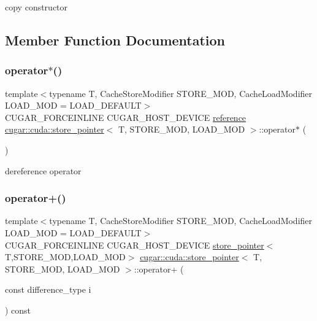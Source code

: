 copy constructor 

\subsection{Member Function Documentation}
\mbox{\label{structcugar_1_1cuda_1_1store__pointer_ac3707b27702fa0ef02349be879a4cc0e}} 
\subsubsection{\texorpdfstring{operator$\ast$()}{operator*()}}
{\footnotesize\ttfamily template$<$typename T, Cache\+Store\+Modifier S\+T\+O\+R\+E\+\_\+\+M\+OD, Cache\+Load\+Modifier L\+O\+A\+D\+\_\+\+M\+OD = L\+O\+A\+D\+\_\+\+D\+E\+F\+A\+U\+LT$>$ \\
C\+U\+G\+A\+R\+\_\+\+F\+O\+R\+C\+E\+I\+N\+L\+I\+NE C\+U\+G\+A\+R\+\_\+\+H\+O\+S\+T\+\_\+\+D\+E\+V\+I\+CE \hyperlink{structcugar_1_1cuda_1_1store__reference}{reference} \hyperlink{structcugar_1_1cuda_1_1store__pointer}{cugar\+::cuda\+::store\+\_\+pointer}$<$ T, S\+T\+O\+R\+E\+\_\+\+M\+OD, L\+O\+A\+D\+\_\+\+M\+OD $>$\+::operator$\ast$ (\begin{DoxyParamCaption}{ }\end{DoxyParamCaption})\hspace{0.3cm}{\ttfamily [inline]}}

dereference operator \mbox{\label{structcugar_1_1cuda_1_1store__pointer_a8ba7f0f228024195d9de88d3341c6aa6}} 
\subsubsection{\texorpdfstring{operator+()}{operator+()}}
{\footnotesize\ttfamily template$<$typename T, Cache\+Store\+Modifier S\+T\+O\+R\+E\+\_\+\+M\+OD, Cache\+Load\+Modifier L\+O\+A\+D\+\_\+\+M\+OD = L\+O\+A\+D\+\_\+\+D\+E\+F\+A\+U\+LT$>$ \\
C\+U\+G\+A\+R\+\_\+\+F\+O\+R\+C\+E\+I\+N\+L\+I\+NE C\+U\+G\+A\+R\+\_\+\+H\+O\+S\+T\+\_\+\+D\+E\+V\+I\+CE \hyperlink{structcugar_1_1cuda_1_1store__pointer}{store\+\_\+pointer}$<$T,S\+T\+O\+R\+E\+\_\+\+M\+OD,L\+O\+A\+D\+\_\+\+M\+OD$>$ \hyperlink{structcugar_1_1cuda_1_1store__pointer}{cugar\+::cuda\+::store\+\_\+pointer}$<$ T, S\+T\+O\+R\+E\+\_\+\+M\+OD, L\+O\+A\+D\+\_\+\+M\+OD $>$\+::operator+ (\begin{DoxyParamCaption}\item[{const difference\+\_\+type}]{i }\end{DoxyParamCaption}) const\hspace{0.3cm}{\ttfamily [inline]}}

